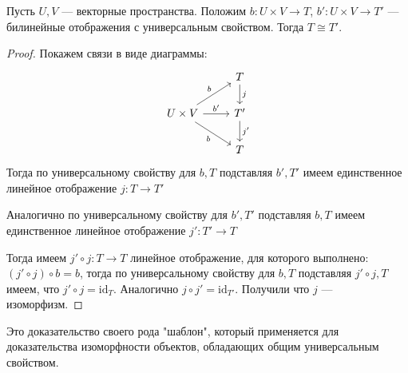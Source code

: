 \documentclass[document]{subfiles}
\begin{document}
\begin{lemma}
    Пусть $U, V$ --- векторные пространства. Положим $b: U \times V \to T$, $b': U \times V \to T'$ --- билинейные отображения с универсальным свойством. Тогда $T \cong T'$.
\end{lemma}
\begin{proof}
    Покажем связи в виде диаграммы:
    $$
    \begin{tikzcd}
        & T \arrow[d, "j"] \\
        U \times V \arrow[ur, "b"] \arrow[r, "b'"] \arrow[dr, "b", swap] & T' \arrow[d, "j'"] \\
        & T
    \end{tikzcd}
    $$
    Тогда по универсальному свойству для $b, T$ подставляя $b', T'$ имеем единственное линейное отображение $j: T \to T'$

    Аналогично по универсальному свойству для $b', T'$ подставляя $b, T$ имеем единственное линейное отображение $j': T' \to T$

    Тогда имеем $j' \circ j: T \to T$ линейное отображение, для которого выполнено: $(j' \circ j) \circ b = b$, тогда по универсальному свойству для $b, T$ подставляя $j' \circ j, T$ имеем, что $j' \circ j = \text{id}_T$. Аналогично $j \circ j' = \text{id}_{T'}$. Получили что $j$ --- изоморфизм.
\end{proof}

Это доказательство своего рода "шаблон", который применяется для доказательства изоморфности объектов, обладающих общим универсальным свойством.
\end{document}

